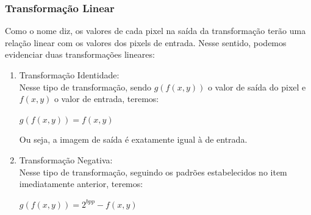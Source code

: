 \documentclass[a4paper, 12pt]{article}
\begin{document}
\subsubsection{Transformação Linear}
Como o nome diz, os valores de cada pixel na saída da transformação terão uma relação linear com os valores dos pixels de entrada. Nesse sentido, 
podemos evidenciar duas transformações lineares: 
\begin{enumerate}
	\item Transformação Identidade:
 	\\
	Nesse tipo de transformação, sendo $g(f(x,y))$ o valor de saída do pixel e $f(x, y)$ o valor de entrada, teremos:
	\begin{center}
		$g(f(x, y)) = f(x,y)$
	\end{center}
	
	Ou seja, a imagem de saída é exatamente igual à de entrada.

	\item Transformação Negativa:
 	\\
	Nesse tipo de transformação, seguindo os padrões estabelecidos no item imediatamente anterior, teremos:
	\begin{center}
		$g(f(x,y)) = 2^{bpp} - f(x,y)$
	\end{center}


\end{enumerate}
\end{document}
